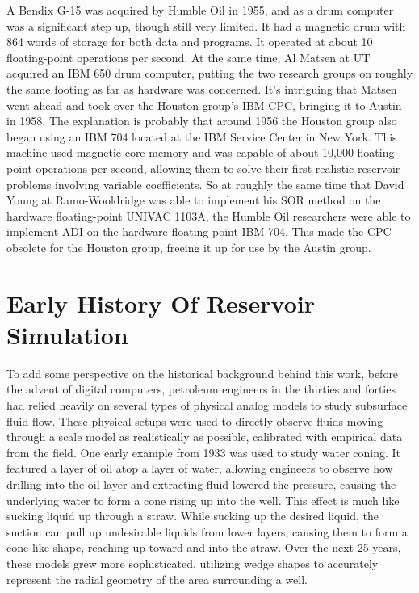 A Bendix G-15 was acquired by Humble Oil in 1955, and as a drum computer was a significant step up, though still very limited. It had a magnetic drum with 864 words of storage for both data and programs. It operated at about 10 floating-point operations per second. At the same time, Al Matsen at UT acquired an IBM 650 drum computer, putting the two research groups on roughly the same footing as far as hardware was concerned. It’s intriguing that Matsen went ahead and took over the Houston group’s IBM CPC, bringing it to Austin in 1958. The explanation is probably that around 1956 the Houston group also began using an IBM 704 located at the IBM Service Center in New York. This machine used magnetic core memory and was capable of about 10,000 floating-point operations per second, allowing them to solve their first realistic reservoir problems involving variable coefficients. So at roughly the same time that David Young at Ramo-Wooldridge was able to implement his SOR method on the hardware floating-point UNIVAC 1103A, the Humble Oil researchers were able to implement ADI on the hardware floating-point IBM 704. This made the CPC obsolete for the Houston group, freeing it up for use by the Austin group.

\section{Early History Of Reservoir Simulation}

To add some perspective on the historical background behind this work, before the advent of digital computers, petroleum engineers in the thirties and forties had relied heavily on several types of physical analog models to study subsurface fluid flow. These physical setups were used to directly observe fluids moving through a scale model as realistically as possible, calibrated with empirical data from the field. One early example from 1933 was used to study water coning. It featured a layer of oil atop a layer of water, allowing engineers to observe how drilling into the oil layer and extracting fluid lowered the pressure, causing the underlying water to form a cone rising up into the well. This effect is much like sucking liquid up through a straw. While sucking up the desired liquid, the suction can pull up undesirable liquids from lower layers, causing them to form a cone-like shape, reaching up toward and into the straw. Over the next 25 years, these models grew more sophisticated, utilizing wedge shapes to accurately represent the radial geometry of the area surrounding a well.

